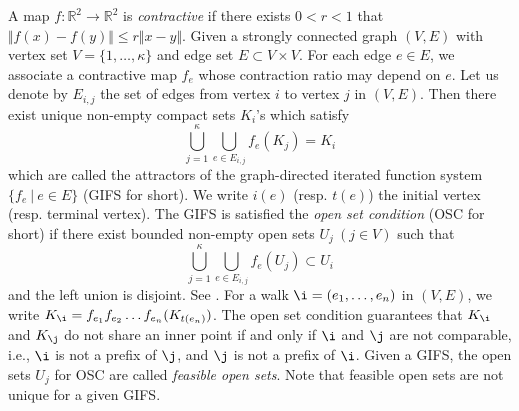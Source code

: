 \documentclass[a4]{amsart}
\newcommand{\R}{{\mathbb R}}
\theoremstyle{definition}
\begin{document}
A map $f:\R^2\to \R^2$ is {\it contractive} 
if there exists $0<r<1$ that
$\Vert f(x)-f(y) \Vert \le r \Vert x-y\Vert$. 
Given a strongly connected graph $(V,E)$ with vertex set $V=\{1,\dots,\kappa\}$ and
edge set $E\subset V\times V$. 
For each edge $e\in E$, 
we associate a contractive map $f_e$ whose contraction ratio may depend 
on $e$. 
Let us denote by $E_{i,j}$ the set of edges from vertex $i$ to vertex $j$ in $(V, E)$. 
Then there exist unique non-empty compact sets $K_i$'s which satisfy
\begin{equation}
\label{GIFS}
\bigcup_{j=1}^{\kappa} \bigcup_{e\in E_{i,j}} f_e(K_j)=K_i
\end{equation}
which are called the attractors of the graph-directed
iterated function system $\{f_e\ |\ e\in E\}$ (GIFS for short).  
We write $i(e)$ (resp. $t(e)$) the initial vertex (resp. terminal vertex).
The GIFS is satisfied the {\it open set condition} (OSC for short) if there exist bounded non-empty open sets $U_j\ (j\in V)$ such that
$$
\bigcup_{j=1}^{\kappa} \bigcup_{e\in E_{i,j}} f_e(U_j)\subset U_i
$$
and the left union is disjoint.
See \cite{Falconer:97}.
For a walk $\i=(e_1,\dots, e_n)$ in $(V,E)$, 
we write 
$K_{\i}=f_{e_1}f_{e_2}\dots f_{e_n}(K_{t(e_n)})$. The open set condition
guarantees that $K_{\i}$ and $K_{\j}$ 
do not share an inner point if and only if $\i$ and 
$\j$ are not comparable, i.e., $\i$ is not a prefix of $\j$, and $\j$ is
not a prefix of $\i$.
Given a GIFS, the open sets $U_j$ for OSC are called {\it feasible open sets}. Note that feasible open sets are 
not unique for a given GIFS. 

\end{document}
